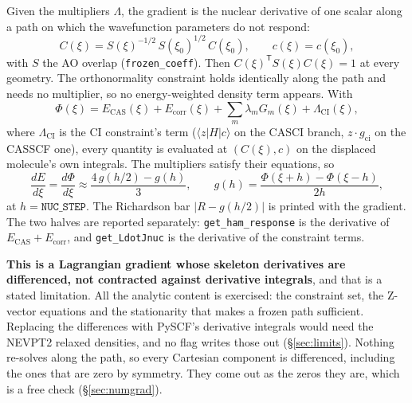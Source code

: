 \documentclass[11pt]{article}
\newcommand{\code}[1]{\texttt{#1}}
\newcommand{\Ecas}{E_{\mathrm{CAS}}}
\newcommand{\Ecorr}{E_{\mathrm{corr}}}
\begin{document}
Given the multipliers $\Lambda$, the gradient is the nuclear derivative of one
scalar along a path on which the wavefunction parameters do not respond:
\begin{equation}
  C(\xi) = S(\xi)^{-1/2}\,S(\xi_0)^{1/2}\,C(\xi_0),\qquad c(\xi) = c(\xi_0),
  \label{eq:frozen}
\end{equation}
with $S$ the AO overlap (\code{frozen\_coeff}). Then $C(\xi)^{\mathsf
T}S(\xi)C(\xi) = 1$ at every geometry. The orthonormality constraint holds
identically along the path and needs no multiplier, so no energy-weighted
density term appears. With
\begin{equation}
  \Phi(\xi) = \Ecas(\xi) + \Ecorr(\xi) + \sum_m \lambda_m G_m(\xi) + \Lambda_{\mathrm{CI}}(\xi),
  \label{eq:phi}
\end{equation}
where $\Lambda_{\mathrm{CI}}$ is the CI constraint's term ($\langle z|H|c\rangle$
on the CASCI branch, $z\cdot g_{\mathrm{ci}}$ on the CASSCF one), every
quantity is evaluated at $(C(\xi), c)$ on the displaced molecule's own
integrals. The multipliers satisfy their equations, so
\begin{equation}
  \frac{dE}{d\xi} = \frac{d\Phi}{d\xi}
  \approx \frac{4\,g(h/2) - g(h)}{3},\qquad
  g(h) = \frac{\Phi(\xi + h) - \Phi(\xi - h)}{2h},
  \label{eq:dphi}
\end{equation}
at $h = \code{NUC\_STEP}$. The Richardson bar $|R - g(h/2)|$ is printed with
the gradient. The two halves are reported separately:
\code{get\_ham\_response} is the derivative of $\Ecas + \Ecorr$, and
\code{get\_LdotJnuc} is the derivative of the constraint terms.

\textbf{This is a Lagrangian gradient whose skeleton derivatives are
differenced, not contracted against derivative integrals}, and that is a stated
limitation. All the analytic content is exercised: the constraint set, the
Z-vector equations and the stationarity that makes a frozen path sufficient.
Replacing the differences with PySCF's derivative integrals would need the
NEVPT2 relaxed densities, and no flag writes those out (\S\ref{sec:limits}).
Nothing re-solves along the path, so every Cartesian component is
differenced, including the ones that are zero by symmetry. They come out as
the zeros they are, which is a free check (\S\ref{sec:numgrad}).
\end{document}

